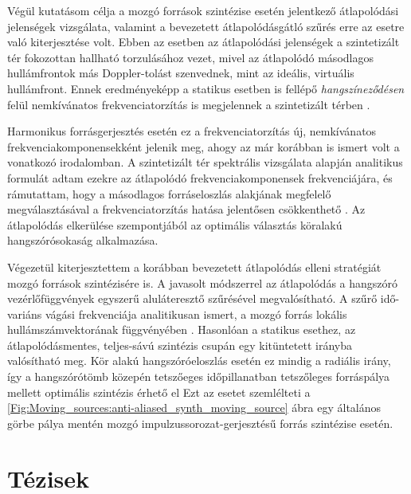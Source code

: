 \documentclass[10pt,twoside]{article}
\theoremstyle{thesisgroupstyle}
\theoremstyle{indented}
\begin{document}
Végül kutatásom célja a mozgó források szintézise esetén jelentkező átlapolódási jelenségek vizsgálata, valamint a bevezetett átlapolódásgátló szűrés erre az esetre való kiterjesztése volt.
Ebben az esetben az átlapolódási jelenségek a szintetizált tér fokozottan hallható torzulásához vezet, mivel az átlapolódó másodlagos hullámfrontok más Doppler-tolást szenvednek, mint az ideális, virtuális hullámfront.
Ennek eredményeképp a statikus esetben is fellépő \emph{hangszíneződésen} felül nemkívánatos frekvenciatorzítás is megjelennek a szintetizált térben \cite{firtha2016:daga_booklet}.

Harmonikus forrásgerjesztés esetén ez a frekvenciatorzítás új, nemkívánatos frekvenciakomponensekként jelenik meg, ahogy az már korábban is ismert volt a vonatkozó irodalomban.
A szintetizált tér spektrális vizsgálata alapján analitikus formulát adtam ezekre az átlapolódó frekvenciakomponensek frekvenciájára, és rámutattam, hogy a másodlagos forráseloszlás alakjának megfelelő megválasztásával a frekvenciatorzítás hatása jelentősen csökkenthető \cite{firtha2016:daga_booklet}.
Az átlapolódás elkerülése szempontjából az optimális választás köralakú hangszórósokaság alkalmazása.

Végezetül kiterjesztettem a korábban bevezetett átlapolódás elleni stratégiát mozgó források szintézisére is.
A javasolt módszerrel az átlapolódás a hangszóró vezérlőfüggvények egyszerű aluláteresztő szűrésével megvalósítható.
A szűrő idő-variáns vágási frekvenciája analitikusan ismert, a mozgó forrás lokális hullámszámvektorának függvényében \cite{Firtha2018_daga_moving_source_booklet}.
Hasonlóan a statikus esethez, az átlapolódásmentes, teljes-sávú szintézis csupán egy kitüntetett irányba valósítható meg.
Kör alakú hangszóróeloszlás esetén ez mindig a radiális irány, így a hangszórótömb közepén tetszőeges időpillanatban tetszőleges forráspálya mellett optimális szintézis érhető el
Ezt az esetet szemlélteti a \ref{Fig:Moving_sources:anti-aliased_synth_moving_source} ábra egy általános görbe pálya mentén mozgó impulzussorozat-gerjesztésű forrás szintézise esetén.

\clearpage	
\section{Tézisek}
\label{sec:theses}
\end{document}
